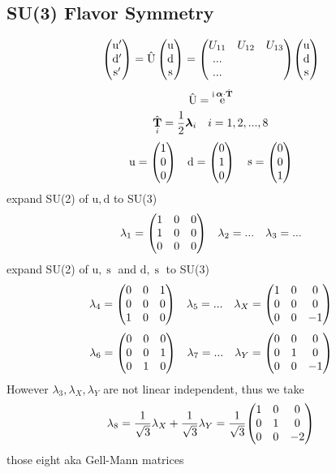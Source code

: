 \documentclass[a4paper]{article}
\DeclareMathOperator{\e}{\mathrm{e}}
\DeclareMathOperator{\I}{\mathrm{i}}
\DeclareMathOperator{\hT}{\hat{\vb{T}}}
\DeclareMathOperator{\hU}{\hat{U}}
\renewcommand{\u}{\mathrm{u}}
\renewcommand{\d}{\mathrm{d}}
\DeclareMathOperator{\s}{\mathrm{s}}
\numberwithin{equation}{section}
\begin{document}
\subsection{SU(3) Flavor Symmetry}
\begin{equation}\label{key}
\mqty(\u' \\ \d' \\ \s') = \hU\mqty(\u\\ \d\\ \s) = 
\mqty(U_{11} & U_{12} & U_{13}\\
      ... &&\\
      ... &&)
\mqty(\u\\ \d\\ \s)
\end{equation}
\begin{equation}\label{key}
\hU = \e^{\I \bm\alpha\cdot\hT}
\end{equation}
\begin{equation}\label{key}
\hT_i = \dfrac{1}{2}\bm\lambda_i \quad i = 1,2,...,8
\end{equation}
\begin{equation}\label{key}
\u = \mqty(1\\ 0\\ 0) \quad \d = \mqty(0\\ 1\\ 0) \quad \s = \mqty(0 \\ 0\\ 1)
\end{equation}
expand SU(2) of $ \u,\d $ to SU(3)
\begin{equation}\label{key}
\lambda_1 = \mqty(1 & 0 & 0\\ 1 & 0 & 0\\ 0 & 0 & 0) \quad
\lambda_2 = ... \quad 
\lambda_3 = ...
\end{equation}
expand SU(2) of $ \u,\s $ and $ \d,\s $ to SU(3)
\begin{equation}\label{key}
\lambda_4 = \mqty(0 & 0 & 1\\ 0 & 0 & 0\\ 1 & 0 & 0) \quad
\lambda_5 = ... \quad 
\lambda_X = \mqty(1 & 0 & 0\\ 0 & 0 & 0\\ 0 & 0 & -1)
\end{equation}
\begin{equation}\label{key}
\lambda_6 = \mqty(0 & 0 & 0\\ 0 & 0 & 1\\ 0 & 1 & 0) \quad
\lambda_7 = ... \quad 
\lambda_Y = \mqty(0 & 0 & 0\\ 0 & 1 & 0\\ 0 & 0 & -1)
\end{equation}
However $ \lambda_3,\lambda_X,\lambda_Y $ are not linear independent, thus we take
\begin{equation}\label{key}
\lambda_8 = \dfrac{1}{\sqrt{3}}\lambda_X + \dfrac{1}{\sqrt{3}}\lambda_Y = \dfrac{1}{\sqrt{3}}\mqty(1 & 0 & 0\\ 0 & 1 & 0\\ 0 & 0 & -2)
\end{equation}
those eight aka Gell-Mann matrices
\end{document}
